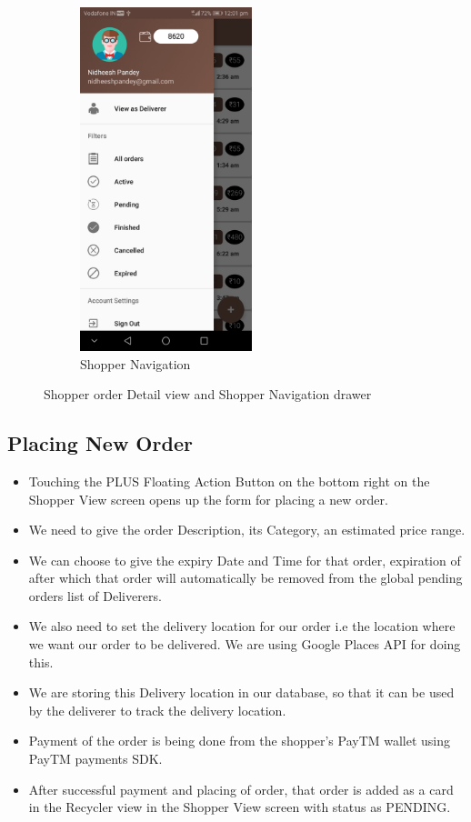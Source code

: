\documentclass{report}
\begin{document}
\begin{figure}[h!]
\begin{subfigure}[b]{.3\textwidth}
\includegraphics[width=5cm]{shopper_drawer.jpg}
\caption{\centering \tiny Shopper Navigation}
\end{subfigure}
\caption{\tiny Shopper order Detail view and Shopper Navigation drawer} 
\label{fig:NASA_Logo}
\end{figure}


\subsection{Placing New Order}
\begin{itemize}
\item Touching the PLUS Floating Action Button on the bottom right on the Shopper View screen opens up the form for placing a new order.
\item We need to give the order Description, its Category, an estimated price range.
\item We can choose to give the expiry Date and Time for that order, expiration of after which that order will automatically be removed from the global pending orders list of Deliverers.
\item We also need to set the delivery location for our order i.e the location where we want our order to be delivered. We are using Google Places API for doing this.
\item We are storing this Delivery location in our database, so that it can be used by the deliverer to track the delivery location.
\item Payment of the order is being done from the shopper’s PayTM wallet using PayTM payments SDK.
\item After successful payment and placing of order, that order is added as a card in the Recycler view in the Shopper View screen with status as PENDING.

\end{itemize}
\end{document}
